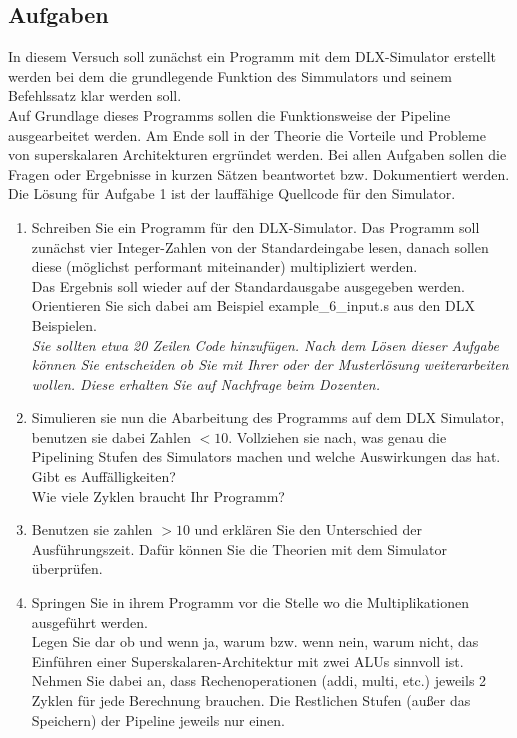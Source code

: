 \subsection*{Aufgaben}
In diesem Versuch soll zunächst ein Programm mit dem DLX-Simulator erstellt werden bei dem die grundlegende Funktion des Simmulators und seinem Befehlssatz klar werden soll. \\
Auf Grundlage dieses Programms sollen die Funktionsweise der Pipeline ausgearbeitet werden.
Am Ende soll in der Theorie die Vorteile und Probleme von superskalaren Architekturen ergründet werden.  
Bei allen Aufgaben sollen die Fragen oder Ergebnisse in kurzen Sätzen beantwortet bzw. Dokumentiert werden. Die Lösung für Aufgabe 1 ist der lauffähige Quellcode für den Simulator.
\begin{enumerate}
    \item Schreiben Sie ein Programm für den DLX-Simulator.
    Das Programm soll zunächst vier Integer-Zahlen von der Standardeingabe lesen, danach sollen diese (möglichst performant miteinander) multipliziert werden. \\
    Das Ergebnis soll wieder auf der Standardausgabe ausgegeben werden.  \\
    Orientieren Sie sich dabei am Beispiel example\_6\_input.s aus den DLX Beispielen. \\
   \textit{\textit{Sie sollten etwa 20 Zeile}n Code hinzufügen. Nach dem Lösen dieser Aufgabe können Sie entscheiden ob Sie mit Ihrer oder der Musterlösung weiterarbeiten wollen. Diese erhalten Sie auf Nachfrage beim Dozenten.}
    \item Simulieren sie nun die Abarbeitung des Programms auf dem DLX Simulator, benutzen sie dabei Zahlen $< 10$. Vollziehen sie nach, was genau die Pipelining Stufen des Simulators machen und welche Auswirkungen das hat. \\ 
    Gibt es Auffälligkeiten? \\
    Wie viele Zyklen braucht Ihr Programm? 
    \item  Benutzen sie zahlen $> 10$ und erklären Sie den Unterschied der Ausführungszeit. Dafür können Sie die Theorien mit dem Simulator überprüfen. 
    \item Springen Sie in ihrem Programm vor die Stelle wo die Multiplikationen ausgeführt werden.
    \\
    Legen Sie dar ob und wenn ja, warum bzw. wenn nein, warum nicht, das Einführen einer Superskalaren-Architektur mit zwei ALUs sinnvoll ist. Nehmen Sie dabei an, dass Rechenoperationen (addi, multi, etc.) jeweils 2 Zyklen für jede Berechnung brauchen. Die Restlichen Stufen (außer das Speichern) der Pipeline jeweils nur einen. 

\end{enumerate}
